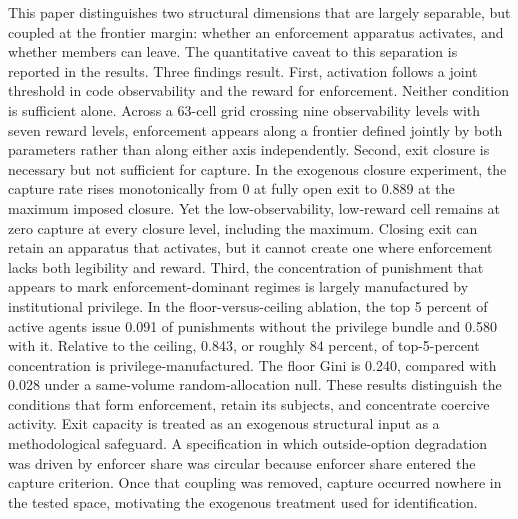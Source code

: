 This paper distinguishes two structural dimensions that are largely separable, but coupled at the frontier margin: whether an enforcement apparatus activates, and whether members can leave. The quantitative caveat to this separation is reported in the results. Three findings result. First, activation follows a joint threshold in code observability and the reward for enforcement. Neither condition is sufficient alone. Across a 63-cell grid crossing nine observability levels with seven reward levels, enforcement appears along a frontier defined jointly by both parameters rather than along either axis independently. Second, exit closure is necessary but not sufficient for capture. In the exogenous closure experiment, the capture rate rises monotonically from 0 at fully open exit to 0.889 at the maximum imposed closure. Yet the low-observability, low-reward cell remains at zero capture at every closure level, including the maximum. Closing exit can retain an apparatus that activates, but it cannot create one where enforcement lacks both legibility and reward. Third, the concentration of punishment that appears to mark enforcement-dominant regimes is largely manufactured by institutional privilege. In the floor-versus-ceiling ablation, the top 5 percent of active agents issue 0.091 of punishments without the privilege bundle and 0.580 with it. Relative to the ceiling, 0.843, or roughly 84 percent, of top-5-percent concentration is privilege-manufactured. The floor Gini is 0.240, compared with 0.028 under a same-volume random-allocation null. These results distinguish the conditions that form enforcement, retain its subjects, and concentrate coercive activity. Exit capacity is treated as an exogenous structural input as a methodological safeguard. A specification in which outside-option degradation was driven by enforcer share was circular because enforcer share entered the capture criterion. Once that coupling was removed, capture occurred nowhere in the tested space, motivating the exogenous treatment used for identification.

